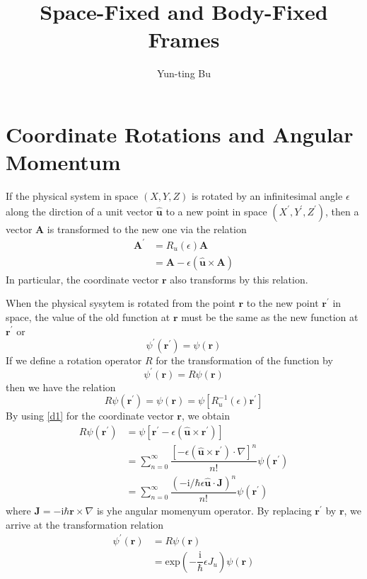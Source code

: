 \documentclass[]{article}
\title{Space-Fixed and Body-Fixed Frames}
\author{Yun-ting Bu}
\begin{document}
	
	\maketitle
\section{Coordinate Rotations and Angular Momentum}

If the physical system in space $(X,Y,Z)$ is rotated by an infinitesimal angle $\epsilon$ along the dirction of a unit vector $\mathbf{\hat{u}}$ to a new point in space $(X^\prime,Y^\prime,Z^\prime)$, then a vector $\mathbf{A}$ is transformed to the new one via the relation
\begin{align}
	\mathbf{A^\prime}&=R_u(\epsilon)\mathbf{A}\nonumber\\
	&=\mathbf{A}-\epsilon(\mathbf{\hat{u}}\times\mathbf{A})
	\label{d1}
\end{align}
In particular, the coordinate vector $\mathbf{r}$ also transforms by this relation.\par 
When the physical sysytem is rotated from the point $\mathbf{r}$ to the new point $\mathbf{r^\prime}$ in space, the value of the old function at $\mathbf{r}$ must be the same as the new function at $\mathbf{r^\prime}$ or
\begin{equation}
	\psi^\prime(\mathbf{r^\prime})=\psi(\mathbf{r})
\end{equation}
If we define a rotation operator $R$ for the transformation of the function by 
\begin{equation}
	\psi^\prime(\mathbf{r})=R\psi(\mathbf{r})
\end{equation}
then we have the relation
\begin{equation}
	R\psi(\mathbf{r^\prime})=\psi(\mathbf{r})=\psi[R^{-1}_u(\epsilon)\mathbf{r^\prime}]
\end{equation}
	By using \eqref{d1} for the coordinate vector $\mathbf{r}$, we obtain
\begin{align}
	R\psi(\mathbf{r^\prime})&=\psi[\mathbf{r^\prime}-\epsilon(\mathbf{\hat{u}}\times\mathbf{r^\prime})]\nonumber\\
	&=\sum\limits_{n=0}^\infty\dfrac{[-\epsilon(\mathbf{\hat{u}}\times\mathbf{r^\prime})\cdot\nabla]^n}{n!}\psi(\mathbf{r^\prime})\nonumber\\
	&=\sum\limits_{n=0}^\infty\dfrac{(-\mathrm{i}/\hbar\epsilon\mathbf{\hat{u}}\cdot\mathbf{J})^n}{n!}\psi(\mathbf{r^\prime})
\end{align}
where $\mathbf{J}=-\mathrm{i}\hbar\mathbf{r}\times\nabla$ is yhe angular momenyum operator. By replacing $\mathbf{r^\prime}$ by $\mathbf{r}$, we arrive at the transformation relation
\begin{align}
	\psi^\prime(\mathbf{r})&=R\psi(\mathbf{r})\nonumber\\
	&=\mathrm{exp}\left( -\dfrac{\mathrm{i}}{\hbar}\epsilon J_u\right) \psi(\mathbf{r})
\end{align}
\end{document}
